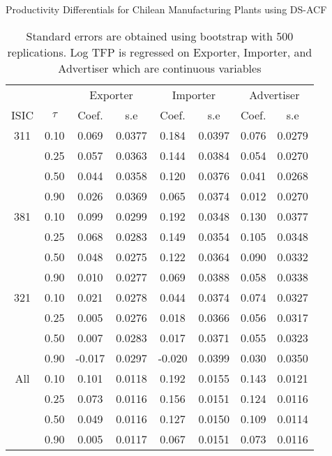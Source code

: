 \documentclass[11pt]{article}
\begin{document}
\begin{table}[H]
\centering
\caption{Productivity Differentials for Chilean Manufacturing Plants using DS-ACF}
\begin{tabular}{cccccccc}
  \hline\hline & & \multicolumn{2}{c}{Exporter}  & \multicolumn{2}{c}{Importer} & \multicolumn{2}{c}{Advertiser} \\ \cmidrule(lr){3-4} \cmidrule(lr){5-6} \cmidrule(lr){7-8}ISIC & $\tau$ & Coef. & s.e & Coef. & s.e & Coef. & s.e \\ 
  \hline
311 & 0.10 & 0.069 & 0.0377 & 0.184 & 0.0397 & 0.076 & 0.0279 \\ 
   & 0.25 & 0.057 & 0.0363 & 0.144 & 0.0384 & 0.054 & 0.0270 \\ 
   & 0.50 & 0.044 & 0.0358 & 0.120 & 0.0376 & 0.041 & 0.0268 \\ 
   & 0.90 & 0.026 & 0.0369 & 0.065 & 0.0374 & 0.012 & 0.0270 \\ 
  381 & 0.10 & 0.099 & 0.0299 & 0.192 & 0.0348 & 0.130 & 0.0377 \\ 
   & 0.25 & 0.068 & 0.0283 & 0.149 & 0.0354 & 0.105 & 0.0348 \\ 
   & 0.50 & 0.048 & 0.0275 & 0.122 & 0.0364 & 0.090 & 0.0332 \\ 
   & 0.90 & 0.010 & 0.0277 & 0.069 & 0.0388 & 0.058 & 0.0338 \\ 
  321 & 0.10 & 0.021 & 0.0278 & 0.044 & 0.0374 & 0.074 & 0.0327 \\ 
   & 0.25 & 0.005 & 0.0276 & 0.018 & 0.0366 & 0.056 & 0.0317 \\ 
   & 0.50 & 0.007 & 0.0283 & 0.017 & 0.0371 & 0.055 & 0.0323 \\ 
   & 0.90 & -0.017 & 0.0297 & -0.020 & 0.0399 & 0.030 & 0.0350 \\ 
  All & 0.10 & 0.101 & 0.0118 & 0.192 & 0.0155 & 0.143 & 0.0121 \\ 
   & 0.25 & 0.073 & 0.0116 & 0.156 & 0.0151 & 0.124 & 0.0116 \\ 
   & 0.50 & 0.049 & 0.0116 & 0.127 & 0.0150 & 0.109 & 0.0114 \\ 
   & 0.90 & 0.005 & 0.0117 & 0.067 & 0.0151 & 0.073 & 0.0116 \\ 
   \hline
\end{tabular}
\caption*{Standard errors are obtained using bootstrap with 500 replications. Log TFP is regressed on Exporter, Importer, and Advertiser  which are continuous variables }
\end{table}
\end{document}
